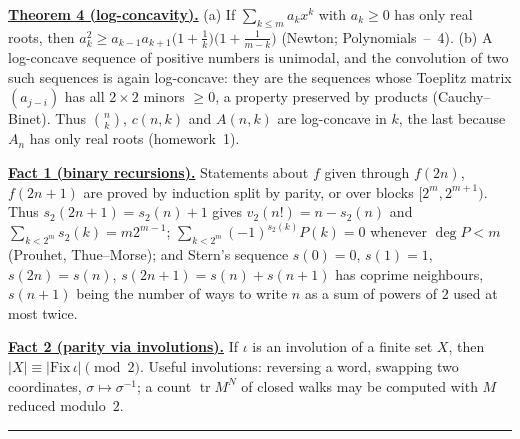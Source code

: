 \documentclass[11pt,a4paper]{article}
\newcommand{\head}[1]{\par\medskip\noindent\textbf{\underline{#1}}\quad}
\begin{document}
\head{Theorem 4 (log-concavity).} (a) If $\sum_{k\leqslant m} a_kx^k$ with $a_k\geqslant0$
has only real roots, then
$a_k^2\geqslant a_{k-1}a_{k+1}\bigl(1+\tfrac1k\bigr)\bigl(1+\tfrac1{m-k}\bigr)$ (Newton;
Polynomials~--~4). (b) A log-concave sequence of positive numbers is unimodal, and the
convolution of two such sequences is again log-concave: they are the sequences whose
Toeplitz matrix $(a_{j-i})$ has all $2\times2$ minors $\geqslant0$, a property preserved by
products (Cauchy--Binet). Thus $\binom nk$, $c(n,k)$ and $A(n,k)$ are log-concave in $k$,
the last because $A_n$ has only real roots (homework~1).

\head{Fact 1 (binary recursions).} Statements about $f$ given through $f(2n)$, $f(2n+1)$
are proved by induction split by parity, or over blocks $[2^m,2^{m+1})$. Thus
$s_2(2n+1)=s_2(n)+1$ gives $v_2(n!)=n-s_2(n)$ and $\sum_{k<2^m}s_2(k)=m2^{m-1}$;
$\sum_{k<2^m}(-1)^{s_2(k)}P(k)=0$ whenever $\deg P<m$ (Prouhet, Thue--Morse); and Stern's
sequence $s(0)=0$, $s(1)=1$, $s(2n)=s(n)$, $s(2n+1)=s(n)+s(n+1)$ has coprime neighbours,
$s(n+1)$ being the number of ways to write $n$ as a sum of powers of $2$ used at most twice.

\head{Fact 2 (parity via involutions).} If $\iota$ is an involution of a finite set $X$, then
$|X|\equiv|\mathrm{Fix}\,\iota|\pmod 2$. Useful involutions: reversing a word, swapping two
coordinates, $\sigma\mapsto\sigma^{-1}$; a count $\operatorname{tr}M^N$ of closed walks may
be computed with $M$ reduced modulo~$2$.

\medskip\noindent\rule{\linewidth}{0.4pt}
\end{document}
